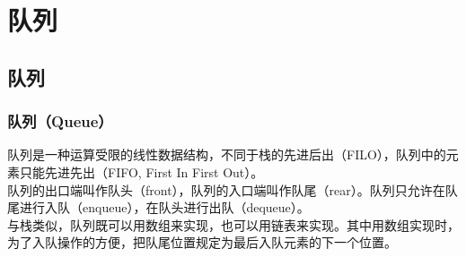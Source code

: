 \chapter{队列}

\section{队列}

\subsection{队列（Queue）}

队列是一种运算受限的线性数据结构，不同于栈的先进后出（FILO），队列中的元素只能先进先出（FIFO, First In First Out）。 \\

队列的出口端叫作队头（front），队列的入口端叫作队尾（rear）。队列只允许在队尾进行入队（enqueue），在队头进行出队（dequeue）。 \\

与栈类似，队列既可以用数组来实现，也可以用链表来实现。其中用数组实现时，为了入队操作的方便，把队尾位置规定为最后入队元素的下一个位置。 \\

